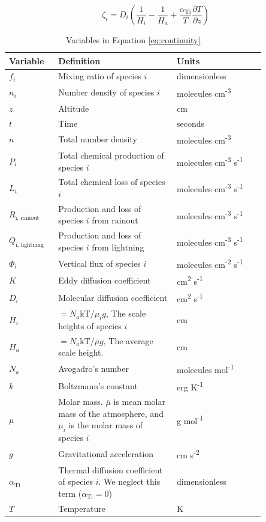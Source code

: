 \begin{equation}
  \zeta_{i} = D_{i}\left( \frac{1}{H_{i}} - \frac{1}{H_{a}} + \frac{\alpha_{\text{Ti}}}{T}\frac{\partial T}{\partial z} \right)
\end{equation}

\begin{table}
\centering
\begin{tabularx}{0.85\textwidth}{p{0.15\linewidth} | p{0.4\linewidth} | p{0.3\linewidth}} \caption{Variables in Equation \eqref{eq:continuity}} \label{tab:variables} \\
\hline \hline
Variable & Definition & Units \\
\hline
\(f_{i}\) & Mixing ratio of species \(i\) & dimensionless \\
\(n_{i}\) & Number density of species \(i\) & molecules
cm\textsuperscript{-3} \\
\(z\) & Altitude & cm \\
\(t\) & Time & seconds \\
\(n\) & Total number density & molecules
cm\textsuperscript{-3} \\
\(P_{i}\) & Total chemical production of species \(i\) & molecules
cm\textsuperscript{-3} s\textsuperscript{-1} \\
\(L_{i}\) & Total chemical loss of species \(i\) & molecules
cm\textsuperscript{-3} s\textsuperscript{-1} \\
\(R_{\text{i, rainout}}\) & Production and loss of species \(i\) from
rainout & molecules cm\textsuperscript{-3}
s\textsuperscript{-1} \\
\(Q_{\text{i, lightning}}\) & Production and loss of species \(i\)
from lightning & molecules cm\textsuperscript{-3}
s\textsuperscript{-1} \\
\(\Phi_{i}\) & Vertical flux of species \(i\) & molecules
cm\textsuperscript{-2} s\textsuperscript{-1} \\
\(K\) & Eddy diffusion coefficient & cm\textsuperscript{2}
s\textsuperscript{-1} \\
\(D_{i}\) & Molecular diffusion coefficient & cm\textsuperscript{2}
s\textsuperscript{-1} \\
\(H_{i}\) & \(= N_{a}\text{kT}\text{/}\mu_{i}g\), The scale heights of
species \(i\) & cm \\
\(H_{a}\) & \(= N_{a}\text{kT}\text{/}\overline{\mu}g\), The average
scale height. & cm \\
\(N_{a}\) & Avogadro's number & molecules
mol\textsuperscript{-1} \\
\(k\) & Boltzmann's constant & erg K\textsuperscript{-1} \\
\(\mu\) & Molar mass. \(\overline{\mu}\) is mean molar mass of the
atmosphere, and \(\mu_{i}\) is the molar mass of species \(i\) & g
mol\textsuperscript{-1} \\
\(g\) & Gravitational acceleration & cm
s\textsuperscript{-2} \\
\(\alpha_{\text{Ti}}\) & Thermal diffusion coefficient of species \(i\).
We neglect this term (\(\alpha_{\text{Ti}} = 0\)) &
dimensionless \\
\(T\) & Temperature & K \\
\end{tabularx}
\end{table}

